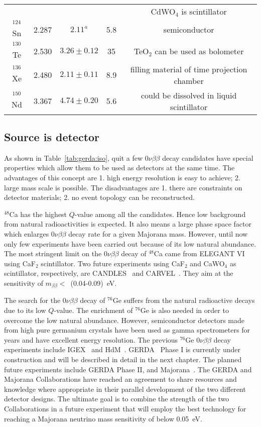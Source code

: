 \begin{table}[htbp]
\begin{minipage}{\linewidth}
\begin{tabular}{ccccc}
& & & & CdWO$_{4}$ is scintillator\\
      $^{124}$Sn & 2.287 & $2.11^{a}$ & 5.8 & semiconductor \\
      $^{130}$Te & 2.530 & $3.26 \pm 0.12$ & 35 & TeO$_{2}$ can be       used as bolometer\\
      $^{136}$Xe & 2.480 & $2.11 \pm 0.11$ & 8.9 & filling material of       time projection chamber\\
      $^{150}$Nd & 3.367 & $4.74 \pm 0.20$ & 5.6 & could be dissolved       in liquid scintillator\\
    \end{tabular}
  \end{minipage}
\end{table}

\subsection{Source is detector}
\label{sec:exp:sed}
As shown in Table~\ref{tab:gerda:iso}, quit a few $0\nu\beta\beta$ decay candidates have special properties which allow them to be used as detectors at the same time. The advantages of this concept are 1. high energy resolution is easy to achieve; 2. large mass scale is possible. The disadvantages are 1. there are constraints on detector materials; 2. no event topology can be reconstructed.

$^{48}$Ca has the highest $Q$-value among all the candidates. Hence low background from natural radioactivities is expected. It also means a large phase space factor which enlarges $0\nu\beta\beta$ decay rate for a given Majorana mass. However, until now only few experiments have been carried out because of its low natural abundance. The most stringent limit on the $0\nu\beta\beta$ decay of $^{48}$Ca came from ELEGANT VI~\cite{Oga04} using CaF$_{2}$ scintillator. Two future experiments using CaF$_{2}$ and CaWO$_{4}$ as scintillator, respectively, are CANDLES~\cite{Ume06} and CARVEL~\cite{Zde05}. They aim at the sensitivity of $m_{\beta\beta} <$~(0.04-0.09)~eV.

The search for the $0\nu\beta\beta$ decay of $^{76}$Ge suffers from the natural radioactive decays due to its low $Q$-value. The enrichment of $^{76}$Ge is also needed in order to overcome the low natural abundance. However, semiconductor detectors made from high pure germanium crystals have been used as gamma spectrometers for years and have excellent energy resolution. The previous $^{76}$Ge $0\nu\beta\beta$ decay experiments include IGEX~\cite{Aal02} and HdM~\cite{Hei04}. GERDA~\cite{Sch05} Phase I is currently under construction and will be described in detail in the next chapter. The planned future experiments include GERDA Phase II, and Majorana~\cite{Gai03, Aal04}. The GERDA and Majorana Collaborations have reached an agreement to share resources and knowledge where appropriate in their parallel development of the two different detector designs. The ultimate goal is to combine the strength of the two Collaborations in a future experiment that will employ the best technology for reaching a Majorana neutrino mass sensitivity of below 0.05~eV.

